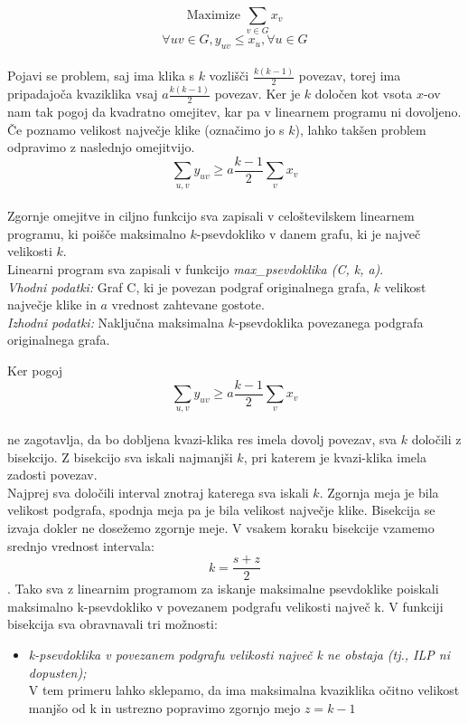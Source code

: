\documentclass[12pt,a4paper]{amsart}
\theoremstyle{definition}
\theoremstyle{plain}
\begin{document}
\begin{itemize}
 $$\text{Maximize }\sum_{v\in G}x_v$$ $$\forall uv \in G,  y_{uv} \leqslant x_u, \forall u \in G$$\\
 
Pojavi se problem, saj ima klika s $k$ vozlišči $\frac{k(k-1)}{2}$ povezav, torej ima pripadajoča kvaziklika vsaj $a \frac{ k(k-1)}{2}$ povezav. Ker je $k$ določen kot vsota $x$-ov nam tak pogoj da kvadratno omejitev, kar pa v linearnem programu ni dovoljeno. Če poznamo velikost največje klike (označimo jo s $k$), lahko takšen problem odpravimo z naslednjo omejitvijo.\\
 
 $$ \sum_{u, v} y_{uv} \geqslant a   \frac{k-1}{2}  \sum_v x_v$$ \\
 
 Zgornje omejitve in ciljno funkcijo sva zapisali v celoštevilskem linearnem programu, ki poišče maksimalno $k$-psevdokliko v danem grafu, ki je največ velikosti $k$. \\

Linearni program sva zapisali v funkcijo \textit{max\_psevdoklika (C, k, a)}.
\\

\textit{Vhodni podatki:} Graf C, ki je povezan podgraf originalnega grafa, $k$ velikost največje klike in $a$ vrednost zahtevane gostote.
\\

\textit{Izhodni podatki:} Naključna maksimalna $k$-psevdoklika povezanega podgrafa originalnega grafa.

 Ker  pogoj \\
  $$ \sum_{u, v} y_{uv} \geqslant a   \frac{k-1}{2}  \sum_v x_v$$ \\
ne zagotavlja, da bo dobljena kvazi-klika res imela dovolj povezav, sva $k$ določili z bisekcijo. Z bisekcijo sva iskali najmanjši $k$, pri katerem je kvazi-klika imela zadosti povezav. 
\\

Najprej sva določili interval znotraj katerega sva iskali $k$. Zgornja meja je bila velikost podgrafa, spodnja meja pa je bila velikost največje klike. Bisekcija se izvaja dokler ne dosežemo zgornje meje. V vsakem koraku bisekcije vzamemo srednjo vrednost intervala: $$k = \frac{s+z}{2}$$.
Tako sva z linearnim programom za iskanje maksimalne psevdoklike poiskali maksimalno k-psevdokliko v povezanem podgrafu velikosti največ k.
V funkciji bisekcija sva obravnavali tri možnosti:\\

\begin{itemize}
\item \textit{k-psevdoklika v povezanem podgrafu velikosti največ k ne obstaja (tj., ILP ni dopusten);}\\ V tem primeru lahko sklepamo, da ima maksimalna kvaziklika očitno velikost manjšo od k in   ustrezno popravimo zgornjo mejo $z = k-1$\\


\end{itemize}
\end{itemize}
\end{document}
